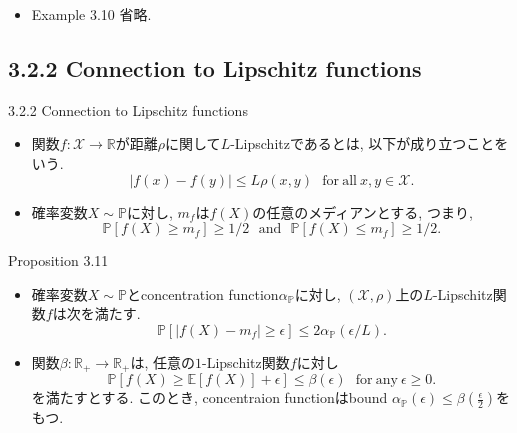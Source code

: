 \documentclass[aspectratio=169, dvipdfmx]{beamer}
\newcommand{\ex}{\mathbb{E}}
\begin{document}
\begin{frame}
\begin{itemize}
    \item Example 3.10 省略.
\end{itemize}
\end{frame}

\subsection{3.2.2 Connection to Lipschitz functions}
\begin{frame}{3.2.2 Connection to Lipschitz functions}
\begin{itemize}
    \item 関数$f:\mathcal{X}\to\mathbb{R}$が距離$\rho$に関して$L$-Lipschitzであるとは, 以下が成り立つことをいう.
    \[ |f(x)-f(y)| \le L \rho(x, y) \ \ \ \mathrm{for\ all}\ x,y\in\mathcal{X}. \tag{3.36}\label{3.36}\]
    \item 確率変数$X \sim \mathbb{P}$に対し, $m_f$は$f(X)$の任意のメディアンとする, つまり,
    \[ \mathbb{P}[f(X) \ge m_f] \ge 1/2\ \ \ \mathrm{and}\ \ \ \mathbb{P}[f(X) \le m_f] \ge 1/2. \tag{3.37}\label{3.37}\]
\end{itemize}
\begin{block}{Proposition 3.11}
\begin{itemize}
    \item 確率変数$X\sim \mathbb{P}$とconcentration function$\alpha_{\mathbb{P}}$に対し,
    $(\mathcal{X}, \rho)$上の$L$-Lipschitz関数$f$は次を満たす.
    \[ \mathbb{P}[|f(X)-m_f|\ge \epsilon] \le 2 \alpha_{\mathbb{P}}(\epsilon/L). \tag{3.39a}\label{3.39a}\]
    \item 関数$\beta:\mathbb{R}_+\to\mathbb{R}_+$は, 任意の$1$-Lipschitz関数$f$に対し
    \[ \mathbb{P}[f(X) \ge \ex[f(X)] + \epsilon] \le \beta(\epsilon)\ \ \ \mathrm{for\ any}\ \epsilon \ge 0. \tag{3.39b}\label{3.39b}\]
    を満たすとする. このとき, concentraion functionはbound $\alpha_{\mathbb{P}}(\epsilon) \le \beta(\frac{\epsilon}{2})$をもつ.
\end{itemize}
\end{block}
\end{frame}
\end{document}
